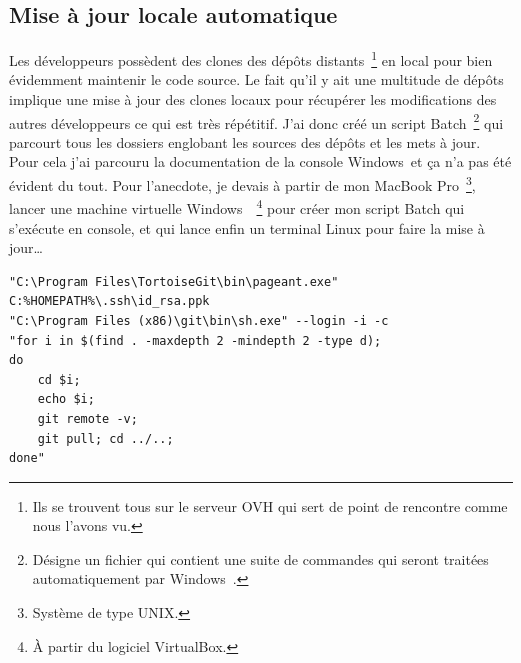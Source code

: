 \subsection{Mise à jour locale automatique} %
\label{sub:Mise à jour locale automatique}

Les développeurs possèdent des clones des dépôts distants\,
\footnote{Ils se trouvent tous sur le serveur OVH qui sert de point de
rencontre comme nous l'avons vu.} en local pour bien évidemment
maintenir le code source. Le fait qu'il y ait une multitude de dépôts
implique une mise à jour des clones locaux pour récupérer les
modifications des autres développeurs ce qui est très répétitif. J'ai
donc créé un script Batch\, \footnote{Désigne un fichier qui contient
une suite de commandes qui seront traitées automatiquement par
Windows~\textregistered.} qui parcourt tous les dossiers englobant les
sources des dépôts et les mets à jour. Pour cela j'ai parcouru la
documentation de la console Windows~\textregistered et ça n'a pas été
évident du tout. Pour l'anecdote, je devais à partir de mon MacBook
Pro\, \footnote{Système de type UNIX.}, lancer une machine virtuelle
Windows~\textregistered\, \footnote{À partir du logiciel VirtualBox.}
pour créer mon script Batch qui s'exécute en console, et qui lance enfin
un terminal Linux pour faire la mise à jour\dots\\

\begin{lstlisting}[basicstyle=\ttfamily\small, frame=trBL]
"C:\Program Files\TortoiseGit\bin\pageant.exe"
C:%HOMEPATH%\.ssh\id_rsa.ppk
"C:\Program Files (x86)\git\bin\sh.exe" --login -i -c
"for i in $(find . -maxdepth 2 -mindepth 2 -type d);
do
    cd $i;
    echo $i;
    git remote -v;
    git pull; cd ../..;
done"
\end{lstlisting}
